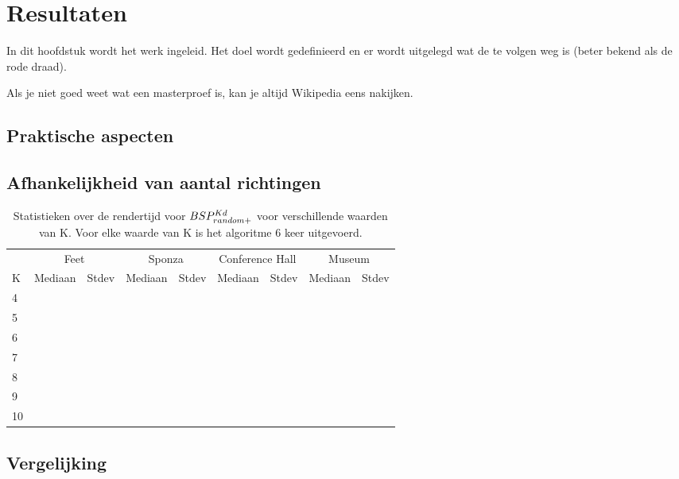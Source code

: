 \chapter{Resultaten}
\label{hoofdstuk:resultaten}
In dit hoofdstuk wordt het werk ingeleid. Het doel wordt gedefinieerd en er
wordt uitgelegd wat de te volgen weg is (beter bekend als de rode draad).

Als je niet goed weet wat een masterproef is, kan je altijd
Wikipedia eens nakijken.

\section{Praktische aspecten}
\section{Afhankelijkheid van aantal richtingen}
\begin{table}
    \centering
    \begin{tabular}{@{}lllllllll@{}} \toprule
      & \multicolumn{2}{c}{Feet} & \multicolumn{2}{c}{Sponza} & \multicolumn{2}{c}{Conference Hall} & \multicolumn{2}{c}{Museum} \\ \cmidrule(r){2-3} \cmidrule(r){4-5} \cmidrule(r){6-7} \cmidrule(r){8-9}
      
      K      & Mediaan     & Stdev & Mediaan & Stdev & Mediaan & Stdev & Mediaan & Stdev \\ \midrule
      4      &     & &     & & & & & \\
      5      &     & &     & & & & & \\
      6      &     & &     & & & & & \\
      7      &     & &     & & & & & \\
      8      &     & &     & & & & & \\
      9      &     & &     & & & & & \\
      10      &     & &     & & & & & \\ \bottomrule
    \end{tabular}
    \caption{Statistieken over de rendertijd voor $BSP^{Kd}_{random+}$ voor verschillende waarden van K. Voor elke waarde van K is het algoritme 6 keer uitgevoerd. }
    \label{tab:bsprandom-k-rendertijd}
  \end{table}
\section{Vergelijking}



